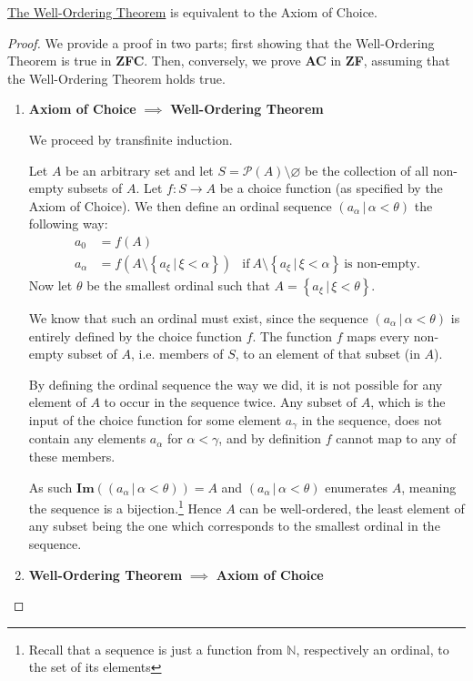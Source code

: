 \documentclass[../../main.tex]{subfiles}
\begin{document}
\begin{theorem}\label{well-order-thm-equivalence}\cite[Theorem 15, p.39]{Jec78}
    \hyperref[well-order-thm]{The Well-Ordering Theorem} is equivalent to the Axiom of Choice. %
\end{theorem}

\begin{proof}
    We provide a proof in two parts; first showing that the Well-Ordering Theorem is true in \textbf{ZFC}.
    Then, conversely, we prove \textbf{AC} in \textbf{ZF}, assuming that the Well-Ordering Theorem holds true.
    \begin{enumerate}
        \item \textbf{Axiom of Choice} $\implies$ \textbf{Well-Ordering Theorem}
        
        We proceed by transfinite induction.

        Let $A$ be an arbitrary set and let $S = \mathcal{P}(A) \setminus \varnothing$ be the collection of all non-empty subsets of $A$.
        Let $f: S \to A$ be a choice function (as specified by the Axiom of Choice).
        We then define an ordinal sequence $\left(a_{\alpha} \, \vert \, \alpha < \theta \right)$ the following way:
        \begin{align*}
            a_0 &= f(A)\\
            a_{\alpha} &= f\left(A \setminus \left\{a_\xi \, \vert \, \xi < \alpha\right\} \right)
            &\text{if}\ A \setminus \left\{a_\xi \, \vert \, \xi < \alpha\right\}\ \text{is non-empty}.
        \end{align*}
        Now let $\theta$ be the smallest ordinal such that $A = \left\{a_\xi \, \vert \, \xi < \theta\right\}$.
        
        We know that such an ordinal must exist, since the sequence $\left(a_{\alpha} \, \vert \, \alpha < \theta \right)$ is entirely defined by the choice function $f$.
        The function $f$ maps every non-empty subset of $A$, i.e. members of $S$, to an element of that subset (in $A$).
        
        By defining the ordinal sequence the way we did, it is not possible for any element of $A$ to occur in the sequence twice.
        Any subset of $A$, which is the input of the choice function for some element $a_\gamma$ in the sequence, does not contain any elements $a_\alpha$ for $\alpha < \gamma$, and by definition $f$ cannot map to any of these members.
        
        As such $\mathbf{Im}\left(\left(a_{\alpha} \, \vert \, \alpha < \theta \right)\right) = A$
        and $\left(a_{\alpha} \, \vert \, \alpha < \theta \right)$ enumerates $A$, meaning the sequence is a bijection.\footnote{Recall that a sequence is just a function from $\mathbb{N}$, respectively an ordinal, to the set of its elements}
        Hence $A$ can be well-ordered, the least element of any subset being the one which corresponds to the smallest ordinal in the sequence.
        \item \textbf{Well-Ordering Theorem} $\implies$ \textbf{Axiom of Choice}
        

\end{enumerate}
\end{proof}
\end{document}
